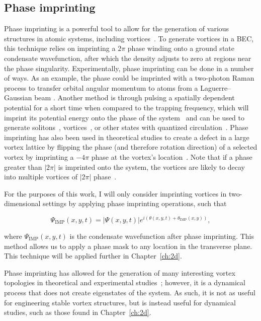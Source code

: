 \subsection{Phase imprinting}

Phase imprinting is a powerful tool to allow for the generation of various structures in atomic systems, including vortices~\cite{kumar2018, moulder2012, burger1999, denschlag2000, wu2002}.
To generate vortices in a BEC, this technique relies on imprinting a $2\pi$ phase winding onto a ground state condensate wavefunction, after which the density adjusts to zero at regions near the phase singularity.
Experimentally, phase imprinting can be done in a number of ways.
As an example, the phase could be imprinted with a two-photon Raman process to transfer orbital angular momentum to atoms from a Laguerre--Gaussian beam \cite{moulder2012, ryu2007}.
Another method is through pulsing a spatially dependent potential for a short time when compared to the trapping frequency, which will imprint its potential energy onto the phase of the system~\cite{kasevich1991} and can be used to generate solitons~\cite{denschlag2000}, vortices~\cite{gajda1999}, or other states with quantized circulation~\cite{kumar2018}.
Phase imprinting has also been used in theoretical studies to create a defect in a large vortex lattice by flipping the phase (and therefore rotation direction) of a selected vortex by imprinting a $-4\pi$ phase at the vortex's location~\cite{o2016topo}.
Note that if a phase greater than $|2\pi|$ is imprinted onto the system, the vortices are likely to decay into multiple vortices of $|2\pi|$ phase~\cite{shin2004}.

For the purposes of this work, I will only consider imprinting vortices in two-dimensional settings by applying phase imprinting operations, such that

\begin{equation}
\Psi_{\text{IMP}}(x,y,t) = |\Psi(x,y,t)|e^{i(\theta(x,y,t) + \theta_{\text{IMP}}(x,y))},
\end{equation}

\noindent where $\Psi_{\text{IMP}}(x,y,t)$ is the condensate wavefunction after phase imprinting.
This method allows us to apply a phase mask to any location in the transverse plane.
This technique will be applied further in Chapter~\ref{ch:2d}.

Phase imprinting has allowed for the generation of many interesting vortex topologies in theoretical and experimental studies~\cite{white2014, maucher2016}; however, it is a dynamical process that does not create eigenstates of the system.
As such, it is not as useful for engineering stable vortex structures, but is instead useful for dynamical studies, such as those found in Chapter~\ref{ch:2d}.

